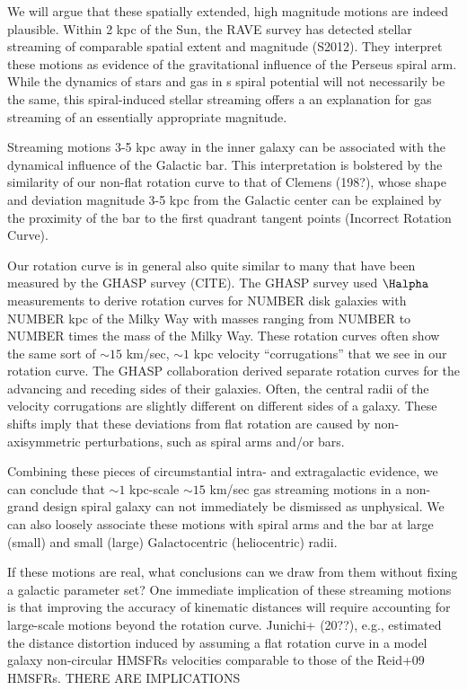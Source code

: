 We will argue that these spatially extended, high magnitude motions are indeed plausible.
Within 2 kpc of the Sun, the RAVE survey has detected stellar streaming of comparable spatial extent and magnitude (S2012). They interpret these motions as evidence of the gravitational influence of the Perseus spiral arm.
While the dynamics of stars and gas in s spiral potential will not necessarily be the same, this spiral-induced stellar streaming offers a an explanation for gas streaming of an essentially appropriate magnitude.

Streaming motions 3-5 kpc away in the inner galaxy can be associated with the dynamical influence of the Galactic bar. 
This interpretation is bolstered by the similarity of our non-flat rotation curve to that of Clemens (198?), whose shape and deviation magnitude 3-5 kpc from the Galactic center can be explained by the proximity of the bar to the first quadrant tangent points (Incorrect Rotation Curve). 

Our rotation curve is in general also quite similar to many that have been measured by the GHASP survey (CITE). 
The GHASP survey used $\Halpha$ measurements to derive rotation curves for NUMBER disk galaxies with NUMBER kpc of the Milky Way with masses ranging from NUMBER to NUMBER times the mass of the Milky Way.
These rotation curves often show the same sort of $\sim 15$ km/sec, $\sim 1$ kpc velocity ``corrugations'' that we see in our rotation curve. 
The GHASP collaboration derived separate rotation curves for the advancing and receding sides of their galaxies.
Often, the central radii of the velocity corrugations are slightly different on different sides of a galaxy.
These shifts imply that these deviations from flat rotation are caused by non-axisymmetric perturbations, such as spiral arms and/or bars.

Combining these pieces of circumstantial intra- and extragalactic evidence, we can conclude that $\sim 1$ kpc-scale $\sim 15$ km/sec gas streaming motions in a non-grand design spiral galaxy can not immediately be dismissed as unphysical. 
We can also loosely associate these motions with spiral arms and the bar at large (small) and small (large) Galactocentric (heliocentric) radii.

If these motions are real, what conclusions can we draw from them without fixing a galactic parameter set? One immediate implication of these streaming motions is that improving the accuracy of kinematic distances will require accounting for large-scale motions beyond the rotation curve. Junichi+ (20??), e.g., estimated the distance distortion induced by assuming a flat rotation curve in a model galaxy non-circular HMSFRs velocities comparable to those of the Reid+09 HMSFRs. 
THERE ARE IMPLICATIONS

